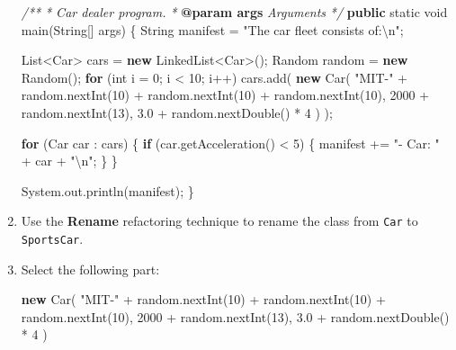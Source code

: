 \documentclass[]{report}
\newenvironment{Shaded}{}{}
\newcommand{\KeywordTok}[1]{\textcolor[rgb]{0.00,0.44,0.13}{\textbf{{#1}}}}
\newcommand{\DataTypeTok}[1]{\textcolor[rgb]{0.56,0.13,0.00}{{#1}}}
\newcommand{\DecValTok}[1]{\textcolor[rgb]{0.25,0.63,0.44}{{#1}}}
\newcommand{\FloatTok}[1]{\textcolor[rgb]{0.25,0.63,0.44}{{#1}}}
\newcommand{\CharTok}[1]{\textcolor[rgb]{0.25,0.44,0.63}{{#1}}}
\newcommand{\StringTok}[1]{\textcolor[rgb]{0.25,0.44,0.63}{{#1}}}
\newcommand{\CommentTok}[1]{\textcolor[rgb]{0.38,0.63,0.69}{\textit{{#1}}}}
\newcommand{\FunctionTok}[1]{\textcolor[rgb]{0.02,0.16,0.49}{{#1}}}
\newcommand{\NormalTok}[1]{{#1}}
\begin{document}
\begin{enumerate}
\begin{Shaded}
\begin{Highlighting}[]
\CommentTok{/**}
\CommentTok{  * Car dealer program. }
\CommentTok{  * }\KeywordTok{@param args }\CommentTok{Arguments}
\CommentTok{  */}
\KeywordTok{public} \DataTypeTok{static} \DataTypeTok{void} \FunctionTok{main}\NormalTok{(String[] args) \{}
  \NormalTok{String manifest = }\StringTok{"The car fleet consists of:}\CharTok{\textbackslash{}n}\StringTok{"}\NormalTok{;}

  \NormalTok{List<Car> cars = }\KeywordTok{new} \NormalTok{LinkedList<Car>();}
  \NormalTok{Random random = }\KeywordTok{new} \NormalTok{Random();}
  \KeywordTok{for} \NormalTok{(}\DataTypeTok{int} \NormalTok{i = }\DecValTok{0}\NormalTok{; i < }\DecValTok{10}\NormalTok{; i++)}
    \NormalTok{cars.}\FunctionTok{add}\NormalTok{(}
      \KeywordTok{new} \FunctionTok{Car}\NormalTok{(}
        \StringTok{"MIT-"} \NormalTok{+ random.}\FunctionTok{nextInt}\NormalTok{(}\DecValTok{10}\NormalTok{) + random.}\FunctionTok{nextInt}\NormalTok{(}\DecValTok{10}\NormalTok{) + random.}\FunctionTok{nextInt}\NormalTok{(}\DecValTok{10}\NormalTok{), }
        \DecValTok{2000} \NormalTok{+ random.}\FunctionTok{nextInt}\NormalTok{(}\DecValTok{13}\NormalTok{),}
        \FloatTok{3.0} \NormalTok{+ random.}\FunctionTok{nextDouble}\NormalTok{() * }\DecValTok{4}
      \NormalTok{)}
    \NormalTok{);}

  \KeywordTok{for} \NormalTok{(Car car : cars) \{}
    \KeywordTok{if} \NormalTok{(car.}\FunctionTok{getAcceleration}\NormalTok{() < }\DecValTok{5}\NormalTok{) \{}
      \NormalTok{manifest += }\StringTok{"- Car: "} \NormalTok{+ car + }\StringTok{"}\CharTok{\textbackslash{}n}\StringTok{"}\NormalTok{;}
    \NormalTok{\}}
  \NormalTok{\}}

  \NormalTok{System.}\FunctionTok{out}\NormalTok{.}\FunctionTok{println}\NormalTok{(manifest);}
\NormalTok{\}}
\end{Highlighting}
\end{Shaded}
\item
  Use the \textbf{Rename} refactoring technique to rename the class from
  \texttt{Car} to \texttt{SportsCar}.
\item
  Select the following part:

\begin{Shaded}
\begin{Highlighting}[]
\KeywordTok{new} \FunctionTok{Car}\NormalTok{(}
  \StringTok{"MIT-"} \NormalTok{+ random.}\FunctionTok{nextInt}\NormalTok{(}\DecValTok{10}\NormalTok{) + random.}\FunctionTok{nextInt}\NormalTok{(}\DecValTok{10}\NormalTok{) + random.}\FunctionTok{nextInt}\NormalTok{(}\DecValTok{10}\NormalTok{), }
  \DecValTok{2000} \NormalTok{+ random.}\FunctionTok{nextInt}\NormalTok{(}\DecValTok{13}\NormalTok{),}
  \FloatTok{3.0} \NormalTok{+ random.}\FunctionTok{nextDouble}\NormalTok{() * }\DecValTok{4}
\NormalTok{)}
\end{Highlighting}
\end{Shaded}


\end{enumerate}
\end{document}

